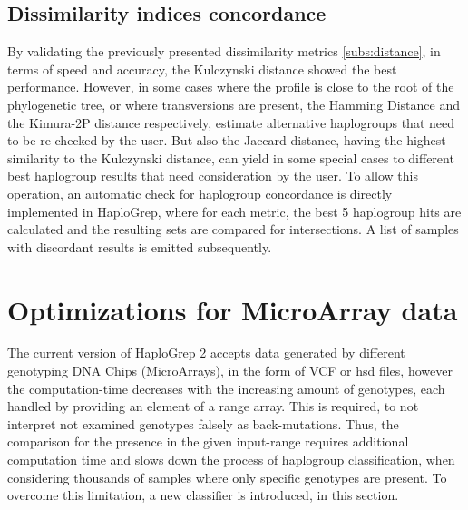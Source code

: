 \subsection{Dissimilarity indices concordance }
By validating the previously presented dissimilarity metrics \ref{subs:distance}, in terms of speed and accuracy, the Kulczynski distance showed the best performance. However, in some cases where the profile is close to the root of the phylogenetic tree, or where transversions are present, the Hamming Distance and the Kimura-2P distance respectively, estimate alternative haplogroups that need to be re-checked by the user. But also the Jaccard distance, having the highest similarity to the Kulczynski distance, can yield in some special cases to different best haplogroup results that need consideration by the user. To allow this operation, an automatic check for haplogroup concordance is directly implemented in HaploGrep, where for each metric, the best 5 haplogroup hits are calculated and the resulting sets are compared for intersections. A list of samples with discordant results is emitted subsequently. 

\section{Optimizations for MicroArray data}\label{hg:optimization}
The current version of HaploGrep 2 accepts data generated by different genotyping DNA Chips (MicroArrays), in the form of VCF or hsd files, however the computation-time decreases with the increasing amount of genotypes, each handled by providing an element of a range array. This is required, to not interpret not examined genotypes falsely as back-mutations. Thus, the comparison for the presence in the given input-range requires additional computation time and slows down the process of haplogroup classification, when considering thousands of samples where only specific genotypes are present. To overcome this limitation, a new classifier is introduced, in this section. 
